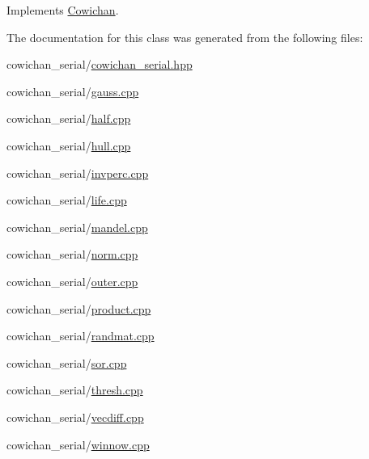 Implements \hyperlink{class_cowichan_13d60e06ced3b5da79d62c133ce82337}{Cowichan}.

The documentation for this class was generated from the following files:\begin{CompactItemize}
\item 
cowichan\_\-serial/\hyperlink{cowichan__serial_8hpp}{cowichan\_\-serial.hpp}\item 
cowichan\_\-serial/\hyperlink{cowichan__serial_2gauss_8cpp}{gauss.cpp}\item 
cowichan\_\-serial/\hyperlink{cowichan__serial_2half_8cpp}{half.cpp}\item 
cowichan\_\-serial/\hyperlink{cowichan__serial_2hull_8cpp}{hull.cpp}\item 
cowichan\_\-serial/\hyperlink{cowichan__serial_2invperc_8cpp}{invperc.cpp}\item 
cowichan\_\-serial/\hyperlink{cowichan__serial_2life_8cpp}{life.cpp}\item 
cowichan\_\-serial/\hyperlink{cowichan__serial_2mandel_8cpp}{mandel.cpp}\item 
cowichan\_\-serial/\hyperlink{cowichan__serial_2norm_8cpp}{norm.cpp}\item 
cowichan\_\-serial/\hyperlink{cowichan__serial_2outer_8cpp}{outer.cpp}\item 
cowichan\_\-serial/\hyperlink{cowichan__serial_2product_8cpp}{product.cpp}\item 
cowichan\_\-serial/\hyperlink{cowichan__serial_2randmat_8cpp}{randmat.cpp}\item 
cowichan\_\-serial/\hyperlink{cowichan__serial_2sor_8cpp}{sor.cpp}\item 
cowichan\_\-serial/\hyperlink{cowichan__serial_2thresh_8cpp}{thresh.cpp}\item 
cowichan\_\-serial/\hyperlink{cowichan__serial_2vecdiff_8cpp}{vecdiff.cpp}\item 
cowichan\_\-serial/\hyperlink{cowichan__serial_2winnow_8cpp}{winnow.cpp}\end{CompactItemize}
